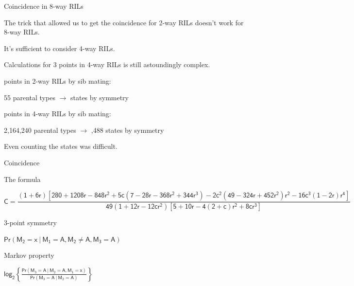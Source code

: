\documentclass[aspectratio=169,12pt,t]{beamer}
\begin{document}
\begin{frame}[c]{Coincidence in 8-way RILs}


\bbi
\item The trick that allowed us to get the coincidence for 2-way RILs
  doesn't work for 8-way RILs.

\item It's sufficient to consider 4-way RILs.

\item Calculations for 3 points in 4-way RILs is still {\vhilit
  astoundingly complex}.


\bi
\item { points in 2-way RILs by sib mating:}

55 parental types $\rightarrow$ { states} by symmetry

\item { points in 4-way RILs by sib mating:}

2,164,240 parental types $\rightarrow$ {,488 states}
by symmetry
\ei

\item Even {\vhilit counting} the states was difficult.
\ei
\end{frame}



\begin{frame}[c]{Coincidence}
\end{frame}




\begin{frame}[c]{The formula}

{ \fontsize{8.2pt}{9.2}\selectfont


$$ \mathsf{C = \frac{(1+6r)[280 + 1208r - 848r^2 + 5c(7-28r - 368r^2 + 344r^3)
  - 2c^2(49 - 324r + 452r^2)r^2 - 16c^3(1-2r)r^4]}{49 (1+12r-12cr^2)
    [5+10r-4(2+c)r^2+8cr^3]} }$$

}


\end{frame}



\begin{frame}[c]{3-point symmetry}

\centerline{\hspace*{15mm} \hilit
$\mathsf{Pr(M_2 = x \ | \ M_1 = A, M_2 \ne A, M_3 = A)}$
}

\end{frame}


\begin{frame}[c]{Markov property}

\centerline{\hspace*{15mm} \hilit
$ \mathsf{log_2 \left\{ \frac{Pr(M_3 = A \ | \ M_2 = A, M_1 = x)}{Pr(M_3 = A \ | \ M_2 = A)} \right\} }$
}

\end{frame}
\end{document}
